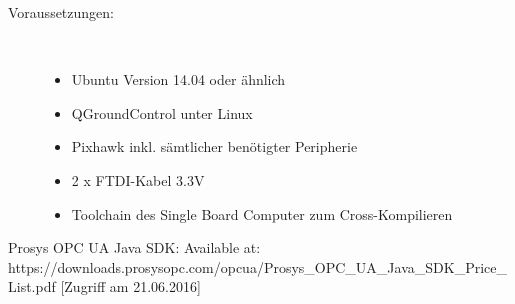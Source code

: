 \documentclass[12pt]{article} %
\begin{document}
	\begin{description}
		\item[Voraussetzungen:]~\par
		\begin{itemize}
			\item Ubuntu Version 14.04 oder ähnlich
			\item QGroundControl unter Linux
			\item Pixhawk inkl. sämtlicher benötigter Peripherie
			\item 2 x FTDI-Kabel 3.3V
			\item Toolchain des Single Board Computer zum Cross-Kompilieren
		\end{itemize}
	\end{description}
	

	
	

\newpage
\renewcommand\refname{Literaturverzeichnis}
\begin{thebibliography}{99} %
	\raggedright
	
	Prosys OPC UA Java SDK:
	\newblock [online] Available at: https://downloads.prosysopc.com/opcua/Prosys\_OPC\_UA\_Java\_SDK\_Price\_List.pdf [Zugriff am 21.06.2016]

\end{thebibliography}

	
\end{document}
